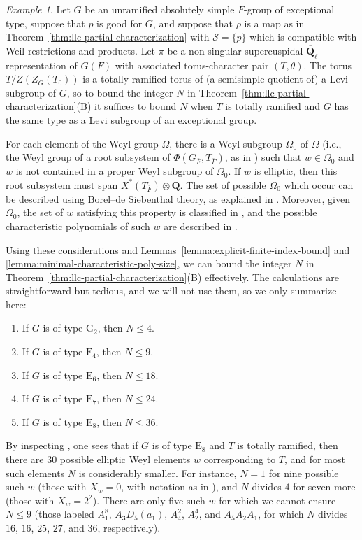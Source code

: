 \documentclass[reqno]{amsart}
\numberwithin{equation}{subsection}
\newcommand{\Q}{\mathbf{Q}}
\newcommand{\ol}[1]{\overline{#1}}
\newcommand\cS{\mathcal{S}}
\theoremstyle{remark}
\newtheorem{example}[thm]{Example}
\numberwithin{equation}{subsection}
\numberwithin{figure}{subsection}
\begin{document}
\begin{example}\label{ex:llc-exceptional}
Let $G$ be an unramified absolutely simple $F$-group of exceptional type, suppose that $p$ is good for $G$, and suppose that $\rho$ is a map as in Theorem~\ref{thm:llc-partial-characterization} with $\cS = \{p\}$ which is compatible with Weil restrictions and products. Let $\pi$ be a non-singular supercuspidal $\ol\Q_\ell$-representation of $G(F)$ with associated torus-character pair $(T, \theta)$. The torus $T/Z(Z_G(T_0))$ is a totally ramified torus of (a semisimple quotient of) a Levi subgroup of $G$, so to bound the integer $N$ in Theorem~\ref{thm:llc-partial-characterization}(B) it suffices to bound $N$ when $T$ is totally ramified and $G$ has the same type as a Levi subgroup of an exceptional group.

For each element of the Weyl group $\Omega$, there is a Weyl subgroup $\Omega_0$ of $\Omega$ (i.e., the Weyl group of a root subsystem of $\Phi(G_{\ol F}, T_{\ol F})$, as in \cite[\S3, Example~(iii)]{Car72}) such that $w \in \Omega_0$ and $w$ is not contained in a proper Weyl subgroup of $\Omega_0$. If $w$ is elliptic, then this root subsystem must span $X^*(T_{\ol F}) \otimes \Q$. The set of possible $\Omega_0$ which occur can be described using Borel--de Siebenthal theory, as explained in \cite[\S4]{Car72}. Moreover, given $\Omega_0$, the set of $w$ satisfying this property is classified in \cite[\S5, Theorem A]{Car72}, and the possible characteristic polynomials of such $w$ are described in \cite[\S6, Proposition 21]{Car72}.

Using these considerations and Lemmas~\ref{lemma:explicit-finite-index-bound} and \ref{lemma:minimal-characteristic-poly-size}, we can bound the integer $N$ in Theorem~\ref{thm:llc-partial-characterization}(B) effectively. The calculations are straightforward but tedious, and we will not use them, so we only summarize here:
\begin{enumerate}
    \item If $G$ is of type $\mathrm{G}_2$, then $N \leq 4$.
    \item If $G$ is of type $\mathrm{F}_4$, then $N \leq 9$.
    \item If $G$ is of type $\mathrm{E}_6$, then $N \leq 18$.
    \item If $G$ is of type $\mathrm{E}_7$, then $N \leq 24$.
    \item If $G$ is of type $\mathrm{E}_8$, then $N \leq 36$.
\end{enumerate}
By inspecting \cite[Table 1]{Ree11}, one sees that if $G$ is of type $\mathrm{E}_8$ and $T$ is totally ramified, then there are $30$ possible elliptic Weyl elements $w$ corresponding to $T$, and for most such elements $N$ is considerably smaller. For instance, $N = 1$ for nine possible such $w$ (those with $X_w = 0$, with notation as in \cite[Table 1]{Ree11}), and $N$ divides $4$ for seven more (those with $X_w = 2^2$). There are only five such $w$ for which we cannot ensure $N \leq 9$ (those labeled $A_1^8$, $A_3D_5(a_1)$, $A_4^2$, $A_2^4$, and $A_5A_2A_1$, for which $N$ divides $16$, $16$, $25$, $27$, and $36$, respectively).
\end{example}
\end{document}
